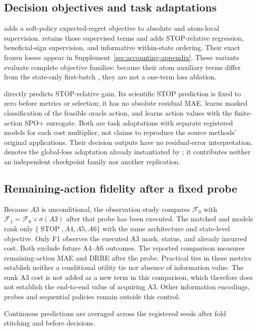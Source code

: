 \subsection{Decision objectives and task adaptations}
 adds a soft-policy expected-regret objective to absolute and
atom-local supervision.  retains those supervised terms and
adds STOP-relative regression, beneficial-sign supervision, and informative
within-state ordering. Their exact frozen losses appear in
Supplement~\ref{sec:accounting-appendix}. These variants evaluate complete
objective families: because their atom auxiliary terms differ from the
state-only first-batch , they are not a one-term loss ablation.

 directly predicts STOP-relative gain. Its scientific STOP
prediction is fixed to zero before metrics or selection; it has no absolute
residual MAE.  learns masked classification of the feasible
oracle action, and  learns action values with the
finite-action SPO+ surrogate. Both are task adaptations with separate
registered models for each cost multiplier, not claims to reproduce the
source methods' original applications. Their decision outputs have no
residual-error interpretation.  denotes the global-loss
adaptation already instantiated by ; it contributes
neither an independent checkpoint family nor another replication.

\subsection{Remaining-action fidelity after a fixed probe}
Because $A3$ is unconditional, the observation study compares
$\mathcal F_0$ with $\mathcal F_1=\mathcal F_0\vee\sigma(A3)$ after that
probe has been executed. The matched  and 
models rank only $\{\operatorname{STOP},A4,A5,A6\}$ with the same
architecture and state-level objective. Only F1 observes the executed A3
mask, status, and already incurred cost. Both exclude future A4--A6 outcomes.
The reported comparison measures remaining-action MAE and DRRE after the
probe. Practical ties in these metrics establish neither a conditional
utility tie nor absence of information value. The sunk A3 cost is not added
as a new term in this comparison, which therefore does not establish the
end-to-end value of acquiring A3. Other information encodings, probes and
sequential policies remain outside this control.

Continuous predictions are averaged across the registered seeds after fold
stitching and before decisions.
